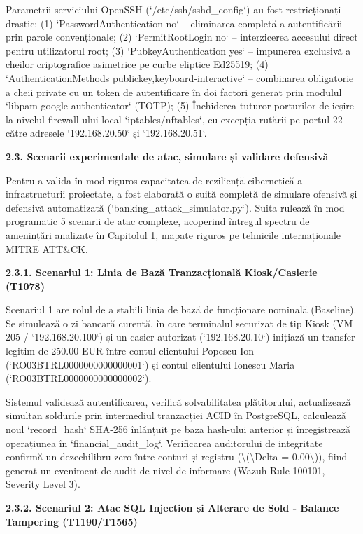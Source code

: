 \documentclass[
]{article}
\begin{document}
Parametrii serviciului OpenSSH (`/etc/ssh/sshd\_config`) au fost
restricționați drastic: (1) `PasswordAuthentication no` -- eliminarea
completă a autentificării prin parole convenționale; (2)
`PermitRootLogin no` -- interzicerea accesului direct pentru
utilizatorul root; (3) `PubkeyAuthentication yes` -- impunerea exclusivă
a cheilor criptografice asimetrice pe curbe eliptice Ed25519; (4)
`AuthenticationMethods publickey,keyboard-interactive` -- combinarea
obligatorie a cheii private cu un token de autentificare în doi factori
generat prin modulul `libpam-google-authenticator` (TOTP); (5)
Închiderea tuturor porturilor de ieșire la nivelul firewall-ului local
`iptables/nftables`, cu excepția rutării pe portul 22 către adresele
`192.168.20.50` și `192.168.20.51`.

\textbf{2.3. Scenarii experimentale de atac, simulare și validare
defensivă}

Pentru a valida în mod riguros capacitatea de reziliență cibernetică a
infrastructurii proiectate, a fost elaborată o suită completă de
simulare ofensivă și defensivă automatizată
(`banking\_attack\_simulator.py`). Suita rulează în mod programatic 5
scenarii de atac complexe, acoperind întregul spectru de amenințări
analizate în Capitolul 1, mapate riguros pe tehnicile internaționale
MITRE ATT\&CK.

\textbf{2.3.1. Scenariul 1: Linia de Bază Tranzacțională Kiosk/Casierie
(T1078)}

Scenariul 1 are rolul de a stabili linia de bază de funcționare nominală
(Baseline). Se simulează o zi bancară curentă, în care terminalul
securizat de tip Kiosk (VM 205 / `192.168.20.100`) și un casier
autorizat (`192.168.20.10`) inițiază un transfer legitim de 250.00 EUR
între contul clientului Popescu Ion (`RO03BTRL0000000000000001`) și
contul clientului Ionescu Maria (`RO03BTRL0000000000000002`).

Sistemul validează autentificarea, verifică solvabilitatea plătitorului,
actualizează simultan soldurile prin intermediul tranzacției ACID în
PostgreSQL, calculează noul `record\_hash` SHA-256 înlănțuit pe baza
hash-ului anterior și înregistrează operațiunea în
`financial\_audit\_log`. Verificarea auditorului de integritate confirmă
un dezechilibru zero între conturi și registru
(\textbackslash(\textbackslash Delta = 0.00\textbackslash)), fiind
generat un eveniment de audit de nivel de informare (Wazuh Rule 100101,
Severity Level 3).

\textbf{2.3.2. Scenariul 2: Atac SQL Injection și Alterare de Sold -
Balance Tampering (T1190/T1565)}
\end{document}

